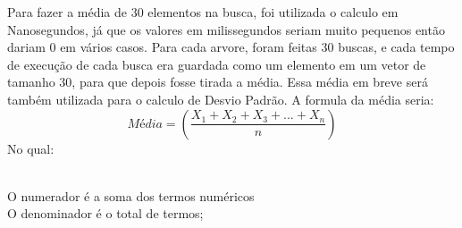 Para fazer a média de 30 elementos na busca, foi utilizada o calculo em Nanosegundos, já que os valores em milissegundos seriam muito pequenos então dariam 0 em vários casos. Para cada arvore, foram feitas 30 buscas, e cada tempo de execução de cada busca era guardada como um elemento em um vetor de tamanho 30, para que depois fosse tirada a média. Essa média em breve será também utilizada para o calculo de Desvio Padrão. A formula da média seria:
        \begin{equation}
            Média = (\frac{X_{1}+X_{2}+X_{3}+...+X_{n}}{n}) 
        \end{equation}
No qual:
        \begin{center}
            \\O numerador é a soma dos termos numéricos
            \\O denominador é o total de termos;
        \end{center}

